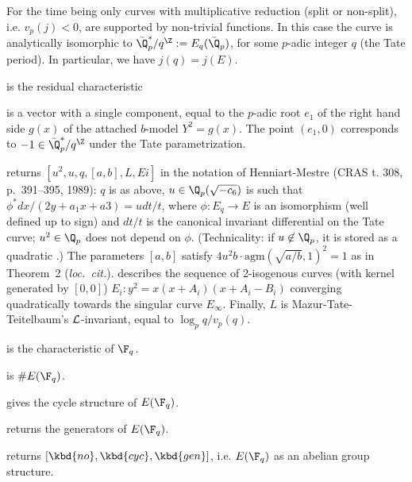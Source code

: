 For the time being only curves with multiplicative reduction (split or
non-split), i.e. $v_p(j) < 0$, are supported by non-trivial functions. In
this case the curve is analytically isomorphic to $\bar{\Q}_p^*/q^\Z :=
E_q(\bar{\Q}_p)$, for some $p$-adic integer $q$ (the Tate period). In
particular, we have $j(q) = j(E)$.

\item {} is the residual characteristic

\item {} is a vector with a single component, equal to the $p$-adic
root $e_1$ of the right hand side $g(x)$ of the attached $b$-model $Y^2
= g(x)$. The point $(e_1,0)$ corresponds to $-1 \in \bar{\Q}_p^*/q^\Z$
under the Tate parametrization.

\item {} returns $[u^2,u,q,[a,b],L, Ei]$ in the notation of Henniart-Mestre
(CRAS t. 308, p.~391--395, 1989): $q$ is as above, $u\in \Q_p(\sqrt{-c_6})$
is such that $\phi^* dx/(2y + a_1x+a3) = u dt/t$, where $\phi: E_q\to E$
is an isomorphism (well defined up to sign) and $dt/t$ is the canonical
invariant differential on the Tate curve; $u^2\in\Q_p$ does not depend on
$\phi$. (Technicality: if $u\not\in\Q_p$, it is stored as a quadratic
.)
The parameters $[a,b]$ satisfy $4u^2 b \cdot \text{agm}(\sqrt{a/b},1)^2 = 1$
as in Theorem~2 (\emph{loc.~cit.}).
 describes the sequence of 2-isogenous curves (with kernel generated
by $[0,0]$) $E_i: y^2=x(x+A_i)(x+A_i-B_i)$ converging quadratically towards
the singular curve $E_\infty$. Finally, $L$ is Mazur-Tate-Teitelbaum's
${\cal L}$-invariant, equal to $\log_p q / v_p(q)$.


\item {} is the characteristic of $\F_q$.

\item {} is $\#E(\F_q)$.

\item {} gives the cycle structure of $E(\F_q)$.

\item {} returns the generators of $E(\F_q)$.

\item {} returns $[\kbd{no},\kbd{cyc},\kbd{gen}]$, i.e. $E(\F_q)$
as an abelian group structure.


